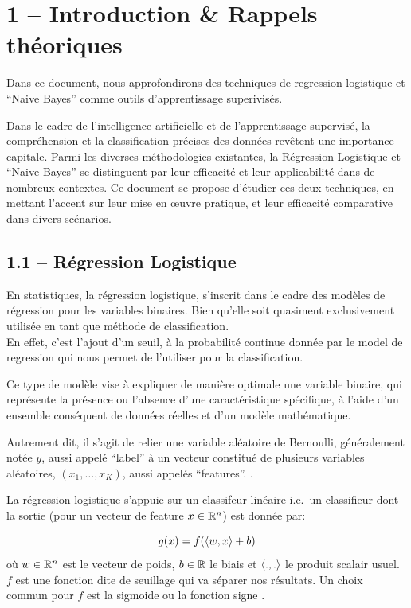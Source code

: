 \documentclass[
]{article}
\author{}
\date{}
\begin{document}
\intro{}

\section{1 -- Introduction \& Rappels
théoriques}\label{introduction-rappels-thuxe9oriques}

Dans ce document, nous approfondirons des techniques de regression
logistique et ``Naive Bayes'' comme outils d'apprentissage superivisés.

Dans le cadre de l'intelligence artificielle et de l'apprentissage
supervisé, la compréhension et la classification précises des données
revêtent une importance capitale. Parmi les diverses méthodologies
existantes, la Régression Logistique et ``Naive Bayes'' se distinguent
par leur efficacité et leur applicabilité dans de nombreux contextes. Ce
document se propose d'étudier ces deux techniques, en mettant l'accent
sur leur mise en œuvre pratique, et leur efficacité comparative dans
divers scénarios.

\subsection{1.1 -- Régression
Logistique}\label{ruxe9gression-logistique}

En statistiques, la régression logistique, s'inscrit dans le cadre des
modèles de régression pour les variables binaires. Bien qu'elle soit
quasiment exclusivement utilisée en tant que méthode de
classification.\\
En effet, c'est l'ajout d'un seuil, à la probabilité continue donnée par
le model de regression qui nous permet de l'utiliser pour la
classification.

Ce type de modèle vise à expliquer de manière optimale une variable
binaire, qui représente la présence ou l'absence d'une caractéristique
spécifique, à l'aide d'un ensemble conséquent de données réelles et d'un
modèle mathématique.

Autrement dit, il s'agit de relier une variable aléatoire de Bernoulli,
généralement notée \(y\), aussi appelé ``label'' à un vecteur constitué
de plusieurs variables aléatoires, \((x_1, \ldots, x_K)\), aussi appelés
``features''. \cite{RegressionLogistique2023}.

La régression logistique s'appuie sur un classifeur linéaire
\cite{ClassifieurLineaire2022} i.e.~un classifieur dont la sortie (pour
un vecteur de feature \(x \in \mathbb{R}^n\)) est donnée par:

\[
g(x) = f(\langle w, x \rangle + b)
\] où \(w \in \mathbb{R}^n\) est le vecteur de poids, \(b \in \mathbb{R}\) le biais et
\(\langle ., . \rangle\) le produit scalair usuel. \(f\) est une fonction
dite de seuillage qui va séparer nos résultats. Un choix commun pour
\(f\) est la sigmoide ou la fonction signe
\cite{ClassifieurLineaire2022}.
\end{document}
